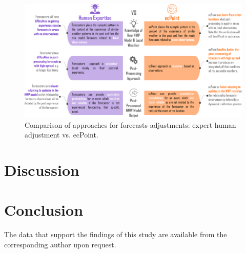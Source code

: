 \documentclass[twocol]{ametsocV5} %
\begin{document}
\begin{figure}
\centerline{\includegraphics[width=39pc]{manuscript/Figures/Fig9.png}}
\caption{Comparison of approaches for forecasts adjustments: expert human adjustment vs. ecPoint.}
\label{Fig.9}
\end{figure}






\section{Discussion}


\section{Conclusion}


\acknowledgments


\datastatement
The data that support the findings of this study are available from the corresponding author upon request.




\end{document}
